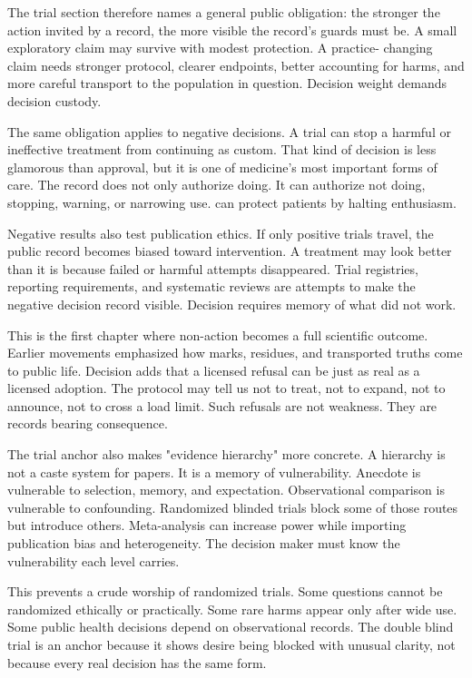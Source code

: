 The trial section therefore names a general public obligation: the stronger
the action invited by a record, the more visible the record's guards must be.
A small exploratory claim may survive with modest protection. A practice-
changing claim needs stronger protocol, clearer endpoints, better accounting
for harms, and more careful transport to the population in question. Decision
weight demands decision custody.

The same obligation applies to negative decisions. A trial can stop a harmful
or ineffective treatment from continuing as custom. That kind of decision is
less glamorous than approval, but it is one of medicine's most important
forms of care. The record does not only authorize doing. It can authorize
not doing, stopping, warning, or narrowing use.  can protect
patients by halting enthusiasm.

Negative results also test publication ethics. If only positive trials travel,
the public record becomes biased toward intervention. A treatment may look
better than it is because failed or harmful attempts disappeared. Trial
registries, reporting requirements, and systematic reviews are attempts to
make the negative decision record visible. Decision requires memory of what
did not work.

This is the first chapter where non-action becomes a full scientific outcome.
Earlier movements emphasized how marks, residues, and transported truths come
to public life. Decision adds that a licensed refusal can be just as real as a
licensed adoption. The protocol may tell us not to treat, not to expand, not
to announce, not to cross a load limit. Such refusals are not weakness. They
are records bearing consequence.

The trial anchor also makes "evidence hierarchy" more concrete. A hierarchy
is not a caste system for papers. It is a memory of vulnerability. Anecdote is
vulnerable to selection, memory, and expectation. Observational comparison is
vulnerable to confounding. Randomized blinded trials block some of those
routes but introduce others. Meta-analysis can increase power while importing
publication bias and heterogeneity. The decision maker must know the
vulnerability each level carries.

This prevents a crude worship of randomized trials. Some questions cannot be
randomized ethically or practically. Some rare harms appear only after wide
use. Some public health decisions depend on observational records. The double
blind trial is an anchor because it shows desire being blocked with unusual
clarity, not because every real decision has the same form.

